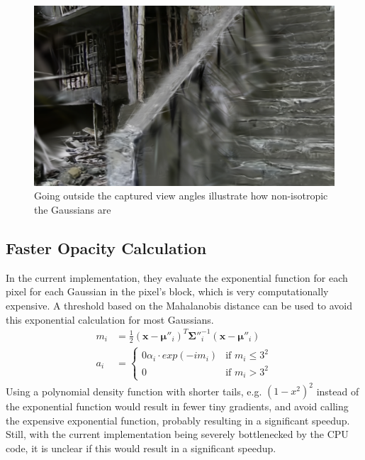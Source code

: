 \begin{figure}
    \centering
    \includegraphics[width=\linewidth]{images/very_isotropic.png}
    \caption{Going outside the captured view angles illustrate how non-isotropic the Gaussians are \cite{@nekoHashimaIslandCreated2023}}
    \label{fig:very_isotropic}
\end{figure}

\subsection{Faster Opacity Calculation}
In the current implementation, they evaluate the exponential function for each pixel for each Gaussian in the pixel's block, which is very computationally expensive.
A threshold based on the Mahalanobis distance can be used to avoid this exponential calculation for most Gaussians.
\begin{align}
    m_i & =\frac{1}{2}(\bm{x}-\bm{\mu}''_i)^T \bm{\Sigma}{''}_i^{-1} (\bm{x}-\bm{\mu}''_i) \\
    a_i & =\begin{cases}
               0 \alpha_i \cdot exp(-im_i) & \text{if } m_i \leq 3^2 \\
               0                           & \text{if } m_i  > 3^2
           \end{cases}
\end{align}
Using a polynomial density function with shorter tails, e.g. $(1-x^2)^2$ instead of the exponential function would result in fewer tiny gradients, and avoid calling the expensive exponential function, probably resulting in a significant speedup.
Still, with the current implementation being severely bottlenecked by the CPU code, it is unclear if this would result in a significant speedup.



